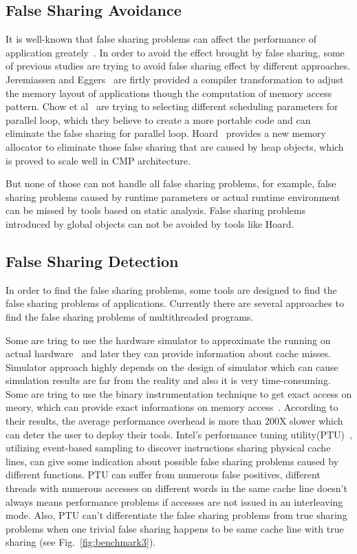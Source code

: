 \subsection{False Sharing Avoidance}
It is well-known that false sharing problems can affect the performance of application greately~\cite{falseshare:compile,falseshare:schedule}. In order to avoid the effect brought by false sharing, some of previous studies are trying to 
avoid false sharing effect by different approaches. 
Jeremiassen and Eggers~\cite{falseshare:compile} are firtly provided a compiler transformation to adjust the memory layout
of applications though the computation of memory access pattern. 
Chow et al~\cite{falseshare:schedule} are trying to selecting different scheduling parameters for parallel loop, which they
believe to create a more portable code and can eliminate the false sharing for parallel loop. 
Hoard~\cite{BergerMcKinleyBlumofeWilson:ASPLOS2000} provides a new memory allocator to eliminate those false sharing that are caused by heap objects, which is proved to scale well in CMP architecture. 

But none of those can not handle all false sharing problems, for example, false sharing problems caused by runtime parameters or 
actual runtime environment can be missed by tools based on static analysis. 
False sharing problems introduced by global objects can not be avoided by tools like Hoard. 

\subsection{False Sharing Detection}
In order to find the false sharing problems, some tools are designed to find the false sharing problems of applications. 
Currently there are several approaches to find the false sharing problems of multithreaded programs. 

Some are tring to use the hardware simulator to approximate the running on 
actual hardware~\cite{falseshare:simulator} and later they can provide information about cache misses. 
Simulator approach highly depends on the design of simulator which can cause simulation results are far from the reality
and also it is very time-consuming.
Some are tring to use the binary instrumentation technique to get exact access on meory, which can provide exact informations
on memory access~\cite{falseshare:binaryinstrumentation1, falseshare:binaryinstrumentation2}. 
According to their results, the average performance overhead is more than 200X slower 
which can deter the user to deploy their tools.  
Intel's performance tuning utility(PTU)~\cite{detect:ptu, detect:intel}, utilizing event-based sampling to discover instructions
sharing physical cache lines, can give some indication about possible false sharing problems caused by different functions.
PTU can suffer from numerous false positives, different threads with numerous accesses on different words in
the same cache line doesn't always means performance problems if accesses are not issued in an interleaving mode. 
Also, PTU can't differentiate the false sharing problems from true sharing problems when one trivial false sharing happens 
to be same cache line with true sharing (see Fig.~\ref{fig:benchmark3}).

